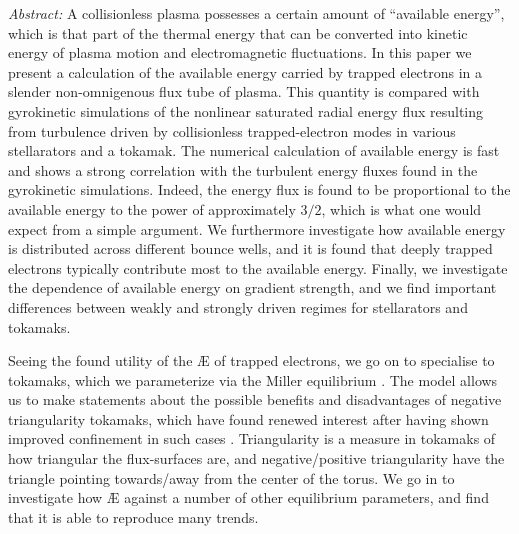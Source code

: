 \textit{Abstract:} A collisionless plasma possesses a certain amount of ``available energy'', which is that part of the thermal energy that can be converted into kinetic energy of plasma motion and electromagnetic fluctuations. In this paper we present a calculation of the available energy carried by trapped electrons in a slender non-omnigenous flux tube of plasma. This quantity is compared with gyrokinetic simulations of the nonlinear saturated radial energy flux resulting from turbulence driven by collisionless trapped-electron modes in various stellarators and a tokamak. The numerical calculation of available energy is fast and shows a strong correlation with the turbulent energy fluxes found in the gyrokinetic simulations. Indeed, the energy flux is found to be proportional to the available energy to the power of approximately $3/2$, which is what one would expect from a simple argument. We furthermore investigate how available energy is distributed across different bounce wells, and it is found that deeply trapped electrons typically contribute most to the available energy. Finally, we investigate the dependence of available energy on gradient strength, and we find important differences between weakly and strongly driven regimes for stellarators and tokamaks.

Seeing the found utility of the \AE{} of trapped electrons, we go on to specialise to tokamaks, which we parameterize via the Miller equilibrium \cite{miller1998noncircular}. The model allows us to make statements about the possible benefits and disadvantages of negative triangularity tokamaks, which have found renewed interest after having shown improved confinement in such cases \cite{marinoni2021brief}. Triangularity is a measure in tokamaks of how triangular the flux-surfaces are, and negative/positive triangularity have the triangle pointing towards/away from the center of the torus. We go in to investigate how \AE{} against a number of other equilibrium parameters, and find that it is able to reproduce many trends.

